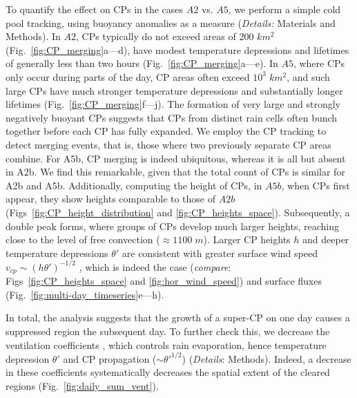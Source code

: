 \documentclass{article}
\begin{document}
To quantify the effect on CPs in the cases $A2$ vs. $A5$, we perform a simple cold pool tracking, using buoyancy anomalies as a measure ({\it Details:} Materials and Methods).
In $A2$, CPs typically do not exceed areas of $200$ $km^2$ (Fig.~\ref{fig:CP_merging}a---d), have modest temperature depressions and lifetimes of generally less than two hours (Fig.~\ref{fig:CP_merging}a---e). 
In $A5$, where CPs only occur during parts of the day, CP areas often exceed $10^3\;km^2$, and such large CPs have much stronger temperature depressions  and substantially longer lifetimes (Fig.~\ref{fig:CP_merging}f---j). 
The formation of very large and strongly negatively buoyant CPs suggests that CPs from distinct rain cells often bunch together before each CP has fully expanded. 
We employ the CP tracking to detect merging events, that is, those where two previously separate CP areas combine.
For A5b, CP merging is indeed ubiquitous, whereas it is all but absent in A2b.
We find this remarkable, given that the total count of CPs is similar for A2b and A5b.
Additionally, computing the height of CPs, in $A5b$, when CPs first appear, they show heights comparable to those of $A2b$ (Figs~\ref{fig:CP_height_distribution} and \ref{fig:CP_heights_space}). 
Subsequently, a double peak forms, where groups of CPs develop much larger heights, reaching close to the level of free convection ($\approx 1100\;m$).
Larger CP heights $h$ and deeper temperature depressions $\theta'$ are consistent with greater surface wind speed $v_{cp}\sim (h\theta')^{-1/2}$ \cite{etling2008theoretische}, which is indeed the case ({\it compare}: Figs~\ref{fig:CP_heights_space} and \ref{fig:hor_wind_speed}) and surface fluxes (Fig.~\ref{fig:multi-day_timeseries}e---h).

In total, the analysis suggests that the growth of a super-CP on one day causes a suppressed region the subsequent day. 
To further check this, we decrease the ventilation coefficients \cite{seifert2006two}, which controls rain evaporation, hence temperature depression $\theta'$ and CP propagation ($\sim \theta'^{1/2}$) ({\it Details}: Methods).
Indeed, a decrease in these coefficients systematically decreases the spatial extent of the cleared regions (Fig.~\ref{fig:daily_sum_vent}).
\end{document}
